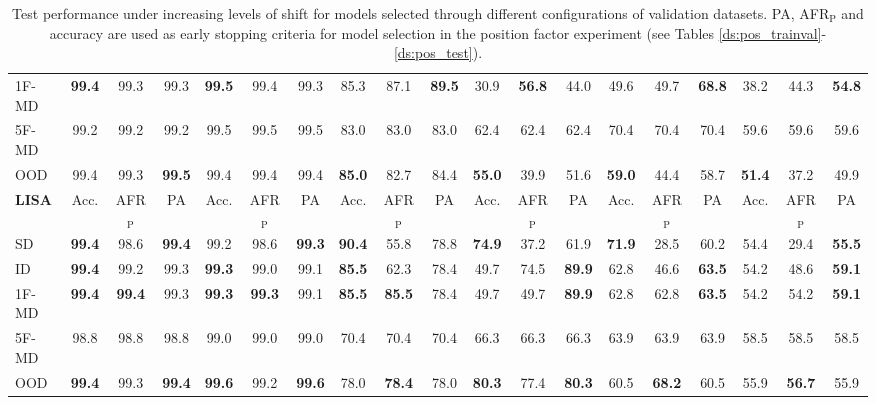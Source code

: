 \begin{table}[H]
{\begin{tabular}{l|ccc|ccc|ccc|ccc|ccc|ccc}
    1F-MD & {\textbf{99.4}} & 99.3 & 99.3 & {\textbf{99.5}} & 99.4 & 99.3 & 85.3 & 87.1 & {\textbf{89.5}} & 30.9 & {\textbf{56.8}} & 44.0 & 49.6 & 49.7 & {\textbf{68.8}} & 38.2 & 44.3 & {\textbf{54.8}} \\
    5F-MD & 99.2 & 99.2 & 99.2 & 99.5 & 99.5 & 99.5 & 83.0 & 83.0 & 83.0 & 62.4 & 62.4 & 62.4 & 70.4 & 70.4 & 70.4 & 59.6 & 59.6 & 59.6 \\
    OOD & 99.4 & 99.3 & {\textbf{99.5}} & 99.4 & 99.4 & 99.4 & {\textbf{85.0}} & 82.7 & 84.4 & {\textbf{55.0}} & 39.9 & 51.6 & {\textbf{59.0}} & 44.4 & 58.7 & {\textbf{51.4}} & 37.2 & 49.9 \\
    \midrule
    \addlinespace
    \addlinespace
    \textbf{{\color{tab:green} \textbf{LISA}}} & Acc. & AFR$_\text{P}$ & PA & Acc. & AFR$_\text{P}$ & PA & Acc. & AFR$_\text{P}$ & PA & Acc. & AFR$_\text{P}$ & PA & Acc. & AFR$_\text{P}$ & PA & Acc. & AFR$_\text{P}$ & PA \\
        \midrule
    SD & \textbf{99.4} & 98.6 & {\textbf{99.4}} & 99.2 & 98.6 & {\textbf{99.3}} & {\textbf{90.4}} & 55.8 & 78.8 & {\textbf{74.9}} & 37.2 & 61.9 & {\textbf{71.9}} & 28.5 & 60.2 & 54.4 & 29.4 & {\textbf{55.5}} \\
    ID & {\textbf{99.4}} & 99.2 & 99.3 & {\textbf{99.3}} & 99.0 & 99.1 & {\textbf{85.5}} & 62.3 & 78.4 & 49.7 & 74.5 & {\textbf{89.9}} & 62.8 & 46.6 & {\textbf{63.5}} & 54.2 & 48.6 & {\textbf{59.1}} \\
    1F-MD & {\textbf{99.4}} & \textbf{99.4} & 99.3 & {\textbf{99.3}} & \textbf{99.3} & 99.1 & {\textbf{85.5}} & \textbf{85.5} & 78.4 & 49.7 & 49.7 & {\textbf{89.9}} & 62.8 & 62.8 & {\textbf{63.5}} & 54.2 & 54.2 & {\textbf{59.1}} \\
    5F-MD & 98.8 & 98.8 & 98.8 & 99.0 & 99.0 & 99.0 & 70.4 & 70.4 & 70.4 & 66.3 & 66.3 & 66.3 & 63.9 & 63.9 & 63.9 & 58.5 & 58.5 & 58.5\\
    OOD & \textbf{99.4} & 99.3 & {\textbf{99.4}} & \textbf{99.6} & 99.2 & {\textbf{99.6}} & 78.0 & {\textbf{78.4}} & 78.0 & \textbf{80.3} & 77.4 & {\textbf{80.3}} & 60.5 & {\textbf{68.2}} & 60.5 & 55.9 & {\textbf{56.7}} & 55.9 \\
    \bottomrule
    \end{tabular}%
    }
    \caption{Test performance under increasing levels of shift for models selected through different configurations of 
    validation datasets. PA, AFR$_{\text{P}}$ and accuracy are used as early stopping criteria for model selection
    in the position factor experiment (see Tables \ref{ds:pos_trainval}-\ref{ds:pos_test}).
    }
    \label{tab:dg_pos_paired}
    \end{table}


